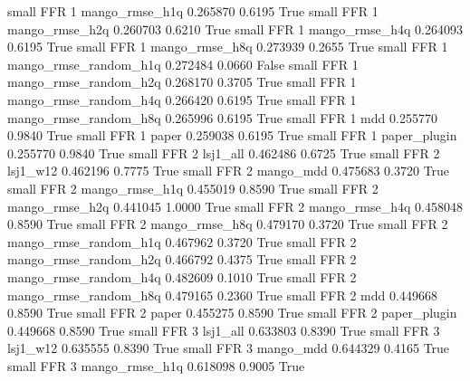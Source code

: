      small      FFR                 1        mango_rmse_h1q   0.265870      0.6195    True
     small      FFR                 1        mango_rmse_h2q   0.260703      0.6210    True
     small      FFR                 1        mango_rmse_h4q   0.264093      0.6195    True
     small      FFR                 1        mango_rmse_h8q   0.273939      0.2655    True
     small      FFR                 1 mango_rmse_random_h1q   0.272484      0.0660   False
     small      FFR                 1 mango_rmse_random_h2q   0.268170      0.3705    True
     small      FFR                 1 mango_rmse_random_h4q   0.266420      0.6195    True
     small      FFR                 1 mango_rmse_random_h8q   0.265996      0.6195    True
     small      FFR                 1                   mdd   0.255770      0.9840    True
     small      FFR                 1                 paper   0.259038      0.6195    True
     small      FFR                 1          paper_plugin   0.255770      0.9840    True
     small      FFR                 2              lsj1_all   0.462486      0.6725    True
     small      FFR                 2              lsj1_w12   0.462196      0.7775    True
     small      FFR                 2             mango_mdd   0.475683      0.3720    True
     small      FFR                 2        mango_rmse_h1q   0.455019      0.8590    True
     small      FFR                 2        mango_rmse_h2q   0.441045      1.0000    True
     small      FFR                 2        mango_rmse_h4q   0.458048      0.8590    True
     small      FFR                 2        mango_rmse_h8q   0.479170      0.3720    True
     small      FFR                 2 mango_rmse_random_h1q   0.467962      0.3720    True
     small      FFR                 2 mango_rmse_random_h2q   0.466792      0.4375    True
     small      FFR                 2 mango_rmse_random_h4q   0.482609      0.1010    True
     small      FFR                 2 mango_rmse_random_h8q   0.479165      0.2360    True
     small      FFR                 2                   mdd   0.449668      0.8590    True
     small      FFR                 2                 paper   0.455275      0.8590    True
     small      FFR                 2          paper_plugin   0.449668      0.8590    True
     small      FFR                 3              lsj1_all   0.633803      0.8390    True
     small      FFR                 3              lsj1_w12   0.635555      0.8390    True
     small      FFR                 3             mango_mdd   0.644329      0.4165    True
     small      FFR                 3        mango_rmse_h1q   0.618098      0.9005    True
